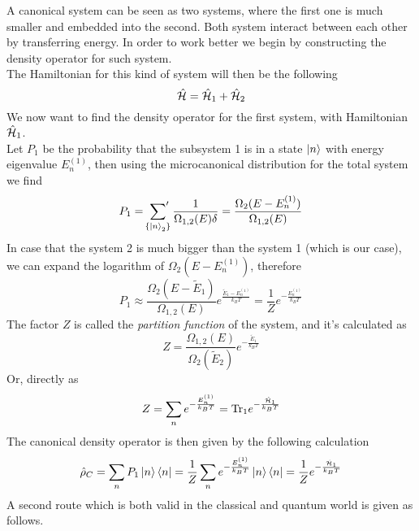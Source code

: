 \documentclass[../qm.tex]{subfiles}
\begin{document}
	A canonical system can be seen as two systems, where the first one is much smaller and embedded into the second. Both system interact between each other by transferring energy. In order to work better we begin by constructing the density operator for such system.\\
		The Hamiltonian for this kind of system will then be the following
		\begin{equation}
			\hat{\mathcal{H}}=\hat{\mathcal{H}}_1+\hat{\mathcal{H}}_2
			\label{eq:canonicalhamiltonian}
		\end{equation}
		We now want to find the density operator for the first system, with Hamiltonian $\hat{\mathcal{H}}_1$.\\
		Let $P_1$ be the probability that the subsystem 1 is in a state $\ket{n}$ with energy eigenvalue $E^{(1)}_n$, then using the microcanonical distribution for the total system we find
		\begin{equation}
			P_1=\sideset{}{'}\sum_{\{\ket{n}_2\}}\frac{1}{\Omega_{1,2}(E)\delta}=\frac{\Omega_2(E-E_n^{(1)})}{\Omega_{1,2}(E)}
			\label{eq:probabilityfirstsystemgc}
		\end{equation}
		In case that the system 2 is much bigger than the system 1 (which is our case), we can expand the logarithm of $\Omega_2(E-E_n^{(1)})$, therefore
		\begin{equation}
			P_{1}\approx\frac{\Omega_2(E-\tilde{E}_1)}{\Omega_{1,2}(E)}e^{\frac{\tilde{E}_1-E_n^{(1)}}{k_BT}}=\frac{1}{Z}e^{-\frac{E_n^{(1)}}{k_BT}}
			\label{eq:probabilitysystem1approx}
		\end{equation}
		The factor $Z$ is called the \textit{partition function} of the system, and it's calculated as
		\begin{equation*}
			Z=\frac{\Omega_{1,2}(E)}{\Omega_2(\tilde{E}_2)}e^{-\frac{\tilde{E}_1}{k_BT}}
		\end{equation*}
		Or, directly as
		\begin{equation}
			Z=\sum_ne^{-\frac{E_n^{(1)}}{k_BT}}=\mathrm{Tr}_1e^{-\frac{\hat{\mathcal{H}}_1}{k_BT}}
			\label{eq:canonicalpartitionfunction}
		\end{equation}
		The canonical density operator is then given by the following calculation
		\begin{equation}
			\hat{\rho}_C=\sum_nP_1\ket{n}\bra{n}=\frac{1}{Z}\sum_ne^{-\frac{E_n^{(1)}}{k_BT}}\ket{n}\bra{n}=\frac{1}{Z}e^{-\frac{\hat{\mathcal{H}}_1}{k_BT}}
			\label{eq:canonicaldensityoperator}
		\end{equation}
		A second route which is both valid in the classical and quantum world is given as follows.\\
\end{document}

